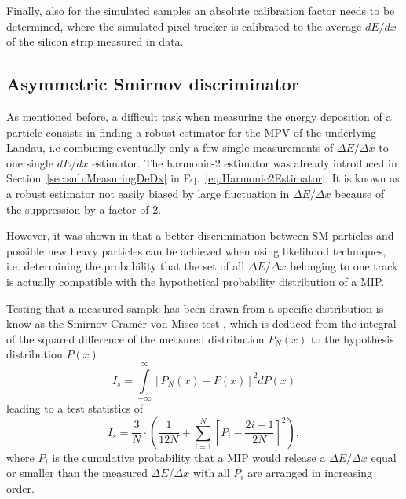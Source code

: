 Finally, also for the simulated samples an absolute calibration factor needs to be determined, where the simulated pixel tracker is  calibrated to the average $dE/dx$ of the silicon strip measured in data.

\subsection{Asymmetric Smirnov discriminator}

As mentioned before, a difficult task when measuring the energy deposition of a particle consists in finding a robust estimator for the MPV of the underlying Landau, i.e combining eventually only a few single measurements of $\Delta E/ \Delta x$ to one single $dE/dx$ estimator.
The harmonic-2 estimator \ihtwo was already introduced in Section~\ref{sec:sub:MeasuringDeDx} in Eq.~\ref{eq:Harmonic2Estimator}.
It is known as a robust estimator not easily biased by large fluctuation in $\Delta E/ \Delta x$ because of the suppression by a factor of 2.

However, it was shown in \cite{bib:Quertenmont_2010} that a better discrimination between SM particles and possible new heavy particles can be achieved when using likelihood techniques,
i.e. determining the probability that the set of all $\Delta E/ \Delta x$ belonging to one track is actually compatible with the hypothetical probability distribution of a MIP.

Testing that a measured sample has been drawn from a specific distribution is know as the Smirnov-Cram\'{e}r-von Mises test \cite{bib:Anderson:CramerVonMises_1962,bib:James:StaticticalMethods_2006},
which is deduced from the integral of the squared difference of the measured distribution $P_N(x)$ to the hypothesis distribution $P(x)$
\begin{equation*}
I_s = \int\limits_{-\infty}^{\infty} \left[P_{N}(x)-P(x)\right]^2 dP(x)
\end{equation*}
leading to a test statistics of
\begin{equation*}
I_s = \frac{3}{N} \cdot \left( \frac{1}{12N} + \sum\limits_{i=1}^N \left[ P_i - \frac{2i-1}{2N} \right]^2 \right),
\end{equation*}
where $P_i$ is the cumulative probability that a MIP would release a $\Delta E/\Delta x$ equal or smaller than the measured $\Delta E/ \Delta x$ with all $P_i$ are arranged in increasing order.

